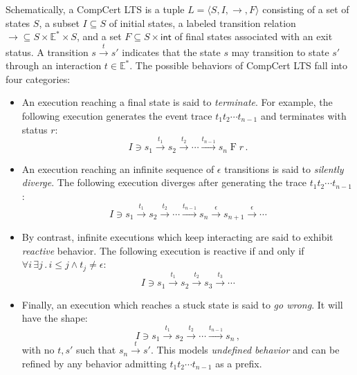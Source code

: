 \documentclass[sigplan,10pt,review,anonymous]{acmart}
\newcommand{\kw}[1]{\ensuremath{ \mathsf{#1} }}
\begin{document}
Schematically, a CompCert LTS
is a tuple
$L = \langle S, I, {\rightarrow}, F \rangle$
consisting of
a set of states $S$,
a subset $I \subseteq S$ of initial states,
a labeled transition relation
${\rightarrow} \subseteq S \times \mathbb{E}^* \times S$,
and a set
$F \subseteq S \times \kw{int}$
of final states associated with an exit status.
A transition $s \stackrel{t}{\rightarrow} s'$
indicates that the state $s$ may transition to state $s'$
through an interaction $t \in \mathbb{E}^*$.
The possible behaviors of CompCert LTS fall into four categories:
\begin{itemize}
\item An execution reaching a final state is said to
    \emph{terminate}.
    For example,
    the following execution generates
    the event trace $t_1 t_2 \cdots t_{n-1}$
    and terminates with status $r$:
    \[
        I \ni s_1 \stackrel{t_1}{\rightarrow}
          s_2 \stackrel{t_2}{\rightarrow}
          \cdots \stackrel{t_{n-1}}{\rightarrow}
          s_n \mathrel{F} r \,.
    \]
\item An execution reaching
    an infinite sequence of $\epsilon$ transitions
    is said to \emph{silently diverge}.
    The following execution diverges after
    generating the trace $t_1 t_2 \cdots t_{n-1}$:
    \[
        I \ni s_1 \stackrel{t_1}{\rightarrow}
          s_2 \stackrel{t_2}{\rightarrow}
          \cdots \stackrel{t_{n-1}}{\rightarrow}
          s_n \stackrel{\epsilon}{\rightarrow}
          s_{n+1} \stackrel{\epsilon}{\rightarrow}
          \cdots
    \]
\item By contrast,
    infinite executions which keep interacting
    are said to exhibit \emph{reactive} behavior.
    The following execution
    is reactive if and only if
    $\forall i \, \exists j \,.\, i \le j \wedge t_j \ne \epsilon$:
    \[
        I \ni s_1 \stackrel{t_1}{\rightarrow}
          s_2 \stackrel{t_2}{\rightarrow}
          s_3 \stackrel{t_3}{\rightarrow}
          \cdots
    \]
\item Finally, an execution which reaches a stuck state
    is said to \emph{go wrong}. It will have the shape:
    \[
        I \ni s_1 \stackrel{t_1}{\rightarrow}
          s_2 \stackrel{t_2}{\rightarrow}
          \cdots \stackrel{t_{n-1}}{\rightarrow}
          s_n \,,
    \]
    with no $t, s'$ such that
    $s_n \stackrel{t}{\rightarrow} s'$.
    This models \emph{undefined behavior}
    and can be refined by any behavior
    admitting $t_1 t_2 \cdots t_{n-1}$ as a prefix.
\end{itemize}
\end{document}
